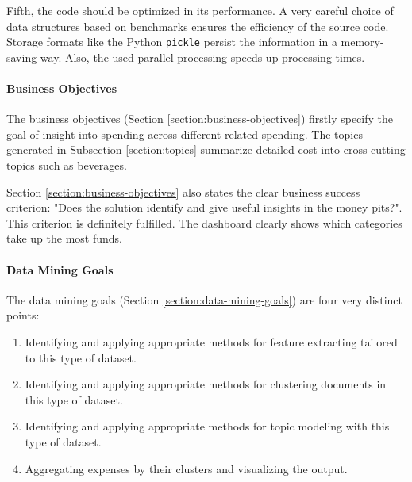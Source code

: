 Fifth, the code should be optimized in its performance. A very careful choice of data structures based on benchmarks ensures the efficiency of the source code. Storage formats like the Python \lstinline|pickle| persist the information in a memory-saving way. Also, the used parallel processing speeds up processing times.

\paragraph{Business Objectives}
The business objectives (Section \ref{section:business-objectives}) firstly specify the goal of insight into spending across different related spending. The topics generated in Subsection \ref{section:topics} summarize detailed cost into cross-cutting topics such as beverages. 



Section \ref{section:business-objectives} also states the clear business success criterion: "Does the solution identify and give useful insights in the money pits?". This criterion is definitely fulfilled. The dashboard clearly shows which categories take up the most funds.


\paragraph{Data Mining Goals}
The data mining goals (Section \ref{section:data-mining-goals}) are four very distinct points:
\begin{enumerate}
	\item Identifying and applying appropriate methods for feature extracting tailored to this type of dataset.
	\item Identifying and applying appropriate methods for clustering documents in this type of dataset.
	\item Identifying and applying appropriate methods for topic modeling with this type of dataset.
	\item Aggregating expenses by their clusters and visualizing the output.
\end{enumerate}


